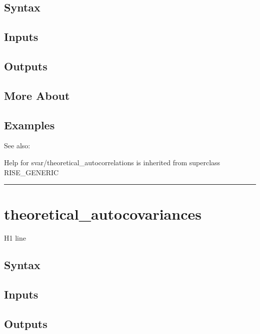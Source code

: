 \documentclass[letterpaper,10pt,english]{sphinxmanual}
\begin{document}
\subsection{Syntax}
\label{classes/models/@svar/svar:id142}

\subsection{Inputs}
\label{classes/models/@svar/svar:id143}

\subsection{Outputs}
\label{classes/models/@svar/svar:id144}

\subsection{More About}
\label{classes/models/@svar/svar:id145}

\subsection{Examples}
\label{classes/models/@svar/svar:id146}
See also:

Help for svar/theoretical\_autocorrelations is inherited from superclass RISE\_GENERIC


\bigskip\hrule{}\bigskip



\section{theoretical\_autocovariances}
\label{classes/models/@svar/svar:id147}\label{classes/models/@svar/svar:theoretical-autocovariances}
H1 line


\subsection{Syntax}
\label{classes/models/@svar/svar:id148}

\subsection{Inputs}
\label{classes/models/@svar/svar:id149}

\subsection{Outputs}
\label{classes/models/@svar/svar:id150}
\end{document}
